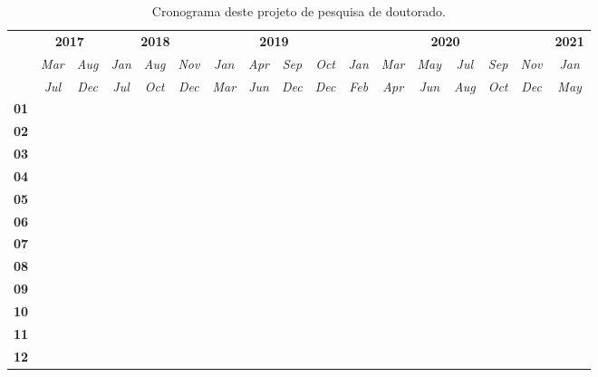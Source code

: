 \begin{table}[htb]
  \renewcommand{\arraystretch}{1.4}
  \caption{Cronograma deste projeto de pesquisa de doutorado.}
  \label{tab:timetable}
  \scriptsize
  \centering
  \begin{tabular}{c|cc|ccc|cccc|cccccc|c}
    \toprule
    & \multicolumn{2}{c|}{{\bf 2017}}
    & \multicolumn{3}{c|}{{\bf 2018}}
    & \multicolumn{4}{c|}{{\bf 2019}}
    & \multicolumn{6}{c|}{{\bf 2020}}
    & {\bf 2021} \\

    & {\it Mar} & {\it Aug} & {\it Jan} & {\it Aug} & {\it Nov} & {\it Jan} &
    {\it Apr} & {\it Sep} & {\it Oct} & {\it Jan} & {\it Mar} & {\it May} &
    {\it Jul} & {\it Sep} & {\it Nov} & {\it Jan} \\

    & {\it Jul} & {\it Dec} & {\it Jul} & {\it Oct} & {\it Dec} & {\it Mar} &
    {\it Jun} & {\it Dec} & {\it Dec} & {\it Feb} & {\it Apr} & {\it Jun} &
    {\it Aug} & {\it Oct} & {\it Dec} & {\it May} \\
    \hline %
    \arrayrulecolor{lightgray}

    {\bf 01} & \m & \m &    &    &    &    &    &    &    &    &    &    &    &    &    &    \\ \hline
    {\bf 02} &    & \m & \m & \m &    &    &    &    &    &    &    &    &    &    &    &    \\ \hline
    {\bf 03} &    &    & \m & \m & \m & \m &    &    &    &    &    &    &    &    &    &    \\ \hline
    {\bf 04} &    &    &    &    & \m & \m & \m &    &    &    &    &    &    &    &    &    \\ \hline
    {\bf 05} &    &    &    &    & \m & \m & \m & \m &    &    &    &    &    &    &    &    \\ \hline
    {\bf 06} &    &    &    &    &    &    &    & \m & \m &    &    &    &    &    &    &    \\ \hline
    {\bf 07} &    &    &    &    &    &    &    &    & \x & \x &    &    &    &    &    &    \\ \hline
    {\bf 08} &    &    &    &    &    &    &    &    &    & \x & \x &    &    &    &    &    \\ \hline
    {\bf 09} &    &    &    &    &    &    &    &    &    & \x & \x & \x & \x & \x &    &    \\ \hline
    {\bf 10} &    &    &    &    &    &    &    &    &    &    &    & \x & \x & \x & \x &    \\ \hline
    {\bf 11} &    &    &    &    &    &    &    &    &    &    &    &    &    & \x & \x &    \\ \hline
    {\bf 12} &    &    &    &    &    &    &    &    &    &    &    &    &    & \x & \x & \x \\


\end{tabular}
\end{table}
